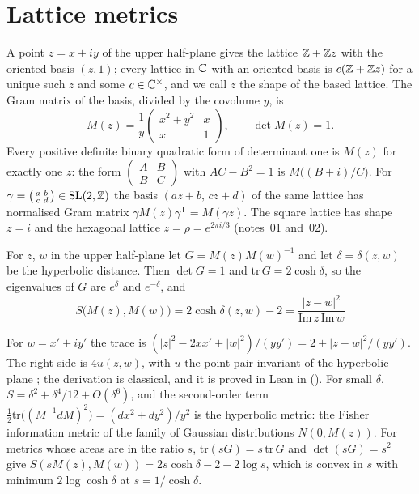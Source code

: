 \documentclass[11pt]{article}
\begin{document}
\section{Lattice metrics}\label{sec:lattice}

A point $z = x+iy$ of the upper half-plane gives the lattice $\mathbb{Z}+\mathbb{Z} z$ with the oriented basis $(z,1)$; every lattice in $\mathbb{C}$ with an oriented basis is $c(\mathbb{Z}+\mathbb{Z} z)$ for a unique such $z$ and some $c\in\mathbb{C}^\times$, and we call $z$ the shape of the based lattice.
The Gram matrix of the basis, divided by the covolume $y$, is
\[
  M(z) = \frac1y\begin{pmatrix}x^2+y^2 & x\\ x & 1\end{pmatrix},\qquad \det M(z) = 1 .
\]
Every positive definite binary quadratic form of determinant one is $M(z)$ for exactly one $z$: the form $\left(\begin{smallmatrix}A&B\\B&C\end{smallmatrix}\right)$ with $AC-B^2=1$ is $M\bigl((B+i)/C\bigr)$.
For $\gamma = \left(\begin{smallmatrix}a&b\\c&d\end{smallmatrix}\right)\in\mathrm{SL}(2,\mathbb{Z})$ the basis $(az+b,\,cz+d)$ of the same lattice has normalised Gram matrix $\gamma M(z)\gamma^{\mathsf T} = M(\gamma z)$.
The square lattice has shape $z=i$ and the hexagonal lattice $z=\rho=e^{2\pi i/3}$ (notes~01 and~02).

\begin{derivation}\label{d:distance}
For $z$, $w$ in the upper half-plane let $G = M(z)M(w)^{-1}$ and let $\delta = \delta(z,w)$ be the hyperbolic distance.
Then $\det G = 1$ and $\mathrm{tr}\,G = 2\cosh\delta$, so the eigenvalues of $G$ are $e^{\delta}$ and $e^{-\delta}$, and
\[
  \boxed{\;S\bigl(M(z),M(w)\bigr) = 2\cosh\delta(z,w)-2 = \frac{|z-w|^2}{\mathrm{Im}\,z\,\mathrm{Im}\,w}\;}
\]
\end{derivation}

\noindent
For $w = x'+iy'$ the trace is $(|z|^2-2xx'+|w|^2)/(yy') = 2+|z-w|^2/(yy')$.
The right side is $4u(z,w)$, with $u$ the point-pair invariant of the hyperbolic plane \cite{Iwaniec}; the derivation is classical, and it is proved in Lean in \formal{} ().
For small $\delta$, $S = \delta^2+\delta^4/12+O(\delta^6)$, and the second-order term $\tfrac12\mathrm{tr}\bigl((M^{-1}dM)^2\bigr) = (dx^2+dy^2)/y^2$ is the hyperbolic metric: the Fisher information metric of the family of Gaussian distributions $N(0,M(z))$.
For metrics whose areas are in the ratio $s$, $\mathrm{tr}(sG) = s\,\mathrm{tr}\,G$ and $\det(sG) = s^2$ give $S(sM(z),M(w)) = 2s\cosh\delta-2-2\log s$, which is convex in $s$ with minimum $2\log\cosh\delta$ at $s = 1/\cosh\delta$.
\end{document}
